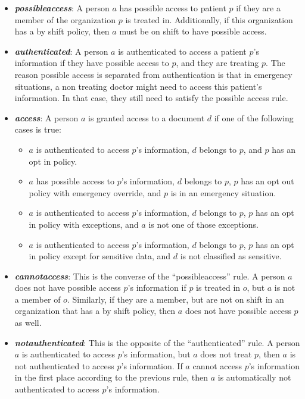 \documentclass[conference]{IEEEtran}
\begin{document}
\begin{itemize}
 \item \textbf{\textit{possibleaccess}}: A person $a$ has possible access to patient $p$ if they are a member of the organization $p$ is treated in.
Additionally, if this organization has a by shift policy, then $a$ must be on shift to have possible access.
\item \textbf{\textit{authenticated}}: A person $a$ is authenticated to access a patient $p$'s information if they have possible access to $p$, and they are
treating $p$. The reason possible access is separated from authentication is that in emergency situations, a non treating doctor might need to access this
patient's information. In that case, they still need to satisfy the possible access rule.
\item \textbf{\textit{access}}: A person $a$ is granted access to a document $d$ if one of the following cases is true:
\begin{itemize}
 \item $a$ is authenticated to access $p$'s information, $d$ belongs to $p$, and $p$ has an opt in policy.
\item $a$ has possible access to $p$'s information, $d$ belongs to $p$, $p$ has an opt out policy with emergency override, and $p$ is in an emergency situation.
\item $a$ is authenticated to access $p$'s information, $d$ belongs to $p$, $p$ has an opt in policy with exceptions, and $a$ is not one of those exceptions.
\item $a$ is authenticated to access $p$'s information, $d$ belongs to $p$, $p$ has an opt in policy except for sensitive data, and $d$ is not classified as
sensitive.
\end{itemize}
\item \textbf{\textit{cannotaccess}}: This is the converse of the ``possibleaccess'' rule. A person $a$ does not have possible access $p$'s information if $p$
is treated in $o$, but $a$ is not a member of $o$. Similarly, if they are a member, but are not on shift in an organization that has a by shift policy, then $a$
does not have possible access $p$ as well.
\item \textbf{\textit{notauthenticated}}: This is the opposite of the ``authenticated'' rule. A person $a$ is authenticated to access $p$'s information, but $a$
does not treat $p$, then $a$ is not authenticated to access $p$'s information. If $a$ cannot access $p$'s information in the first place according to the
previous rule, then $a$ is automatically not authenticated to access $p$'s information.

\end{itemize}
\end{document}
